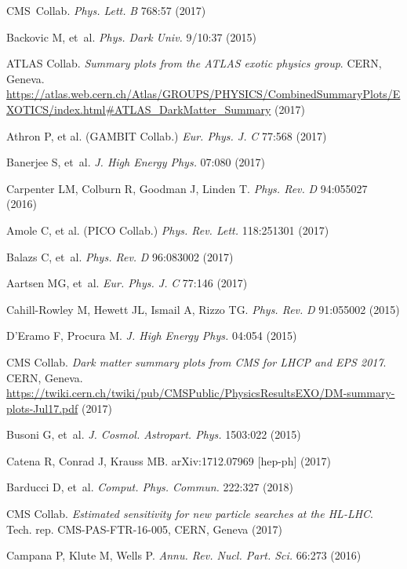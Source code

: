 \documentclass{ar-1col}
\begin{document}
\begin{thebibliography}{175}
{CMS~Collab}. \textit{Phys. Lett.} \textit{B} 768:57 (2017)

Backovic M, et~al. \textit{Phys. Dark Univ.} 9/10:37 (2015)

ATLAS Collab. \textit{Summary plots from the ATLAS exotic
physics group}. CERN, Geneva. \url{https://atlas.web.cern.ch/Atlas/GROUPS/PHYSICS/CombinedSummaryPlots/EXOTICS/index.html#ATLAS_DarkMatter_Summary} (2017)


{Athron P, et al. (GAMBIT Collab}.) \textit{Eur. Phys. J.} \textit{C} 77:568 (2017)

Banerjee S, et~al. \textit{J. High Energy Phys.} 07:080 (2017)

Carpenter LM, Colburn R, Goodman J, Linden T. \textit{Phys. Rev.}
\textit{D} 94:055027 (2016)

Amole C, et al. (PICO Collab.) \textit{Phys. Rev. Lett.} 118:251301 (2017)

Balazs C, et~al. \textit{Phys. Rev.} \textit{D} 96:083002 (2017)

Aartsen MG, et~al. \textit{Eur. Phys. J.} \textit{C} 77:146 (2017)

Cahill-Rowley M, Hewett JL, Ismail A, Rizzo TG. \textit{Phys.
Rev.} \textit{D} 91:055002 (2015)

D'Eramo F, Procura M. \textit{J. High Energy Phys.} 04:054 (2015)

CMS Collab. \textit{Dark \MakeLowercase{Matter Summary Plots} from CMS for LHCP and EPS 2017}. CERN, Geneva. \url{https://twiki.cern.ch/twiki/pub/CMSPublic/PhysicsResultsEXO/DM-summary-plots-Jul17.pdf} (2017)

Busoni G, et~al. \textit{J. Cosmol. Astropart. Phys.} 1503:022 (2015)

Catena R, Conrad J, Krauss MB. arXiv:1712.07969 [hep-ph] (2017)

Barducci D, et~al. \textit{Comput. Phys. Commun.} 222:327 (2018)

{CMS Collab}. \textit{Estimated sensitivity for new particle searches at the HL-LHC}.
Tech. rep. CMS-PAS-FTR-16-005, CERN, Geneva (2017)

Campana P, Klute M, Wells P. \textit{Annu. Rev. Nucl. Part. Sci.}
66:273 (2016)


\end{thebibliography}
\end{document}
